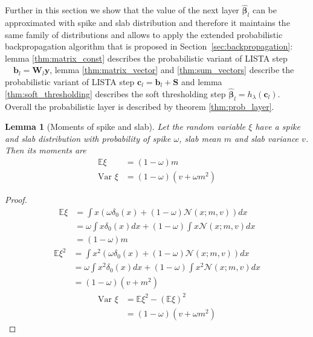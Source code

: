 \documentclass[letterpaper]{article}
\newtheorem{lemma}{Lemma}
\begin{document}
Further in this section we show that the value of the next layer $\widehat{\boldsymbol\beta}_l$ can be approximated with spike and slab distribution and therefore it maintains the same family of distributions and allows to apply the extended probabilistic backpropagation algorithm that is proposed in Section~\ref{sec:backpropagation}: lemma \ref{thm:matrix_const} describes the probabilistic variant of LISTA step $\quad \mathbf{b}_l = \mathbf{W}_l \mathbf{y}$, lemma \ref{thm:matrix_vector} and \ref{thm:sum_vectors} describe the probabilistic variant of LISTA step $ \mathbf{c}_l = \mathbf{b}_l +\mathbf{S}$ and lemma \ref{thm:soft_thresholding} describes the soft thresholding step $\widehat{\boldsymbol\beta}_{l} = h_\lambda(\mathbf{c}_l)$. Overall the probabilistic layer is described by theorem \ref{thm:prob_layer}.

\begin{lemma}[Moments of spike and slab]
\label{thm:moments_spsl}
Let the random variable $\xi$ have a spike and slab distribution with probability of spike $\omega$, slab mean $m$ and slab variance $v$. Then its moments are
\begin{align}
\mathbb{E}\xi &= (1-\omega)m \\
\text{Var }\xi & = (1-\omega)(v + \omega m^2)
\end{align}

\end{lemma}
\begin{proof}
\begin{align}
\mathbb{E}\xi &= \int x (\omega \delta_0(x) + (1 - \omega)\mathcal{N}(x; m, v))dx \\
& = \omega \int x \delta_0(x)dx + (1 - \omega)\int x \mathcal{N}(x; m, v)dx \\
& = (1-\omega)m
\end{align}
\begin{align}
\mathbb{E}\xi^2 &= \int x^2 (\omega \delta_0(x) + (1 - \omega)\mathcal{N}(x; m, v))dx \\
& = \omega \int x^2 \delta_0(x)dx + (1 - \omega)\int x^2 \mathcal{N}(x; m, v)dx \\
& = (1-\omega)(v + m^2)
\end{align}
\begin{align}
\text{Var }\xi &= \mathbb{E}\xi^2 - \left(\mathbb{E}\xi\right)^2\\
& = (1-\omega)(v + \omega m^2)
\end{align}
\end{proof}
\end{document}
